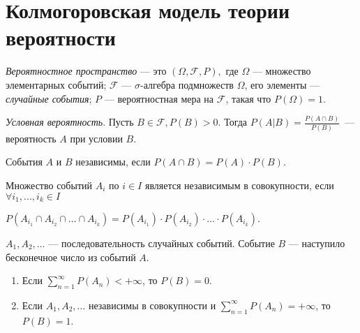 \section{Колмогоровская модель теории вероятности}

 \begin{definition} \textit{Вероятностное пространство} --- это $(\Omega, \mathcal{F}, P),$ где
     $\Omega$ --- множество элементарных событий;
     $\mathcal{F}$ ---  $\sigma$-алгебра подмножеств $\Omega$, его элементы --- \textit{случайные события};
     $P$ --- вероятностная мера на $\mathcal{F}$, такая что $P(\Omega) = 1$.
 \end{definition}


 \begin{definition} \textit{Условная вероятность}.
     Пусть $B \in \mathcal{F}, P(B) > 0$. Тогда
     $P(A|B) = \frac{P(A\cap B)}{P(B)}$~--- вероятность $A$ при условии $B$.

 \end{definition}

 \begin{definition}
     События $A$ и $B$ независимы, если 
     $P(A \cap B) = P(A) \cdot P(B)$.

 \end{definition}

 \begin{definition}
     Множество событий $A_i$ по $i \in I$ является независимым в совокупности, если
     $\forall i_1, ..., i_k \in I$

     $P(A_{i_1}\cap A_{i_2} \cap\ldots\cap A_{i_k}) = P(A_{i_1})\cdot P(A_{i_2})\cdot\ldots\cdot P(A_{i_k})$.

 \end{definition}

 \begin{lemma}\label{lem:borkan}
     $A_1, A_2, \ldots$ --- последовательность случайных событий. Событие $B$ --- наступило бесконечное число из событий $A$.
      \begin{enumerate}
          \item  Если $\sum_{n = 1}^\infty P(A_n) < +\infty$, то $P(B) = 0$.
          \item Если $A_1, A_2, \ldots$ независимы в совокупности и $\sum_{n = 1}^\infty P(A_n) = +\infty$, то
     $P(B) = 1$.
      \end{enumerate}

 \end{lemma}

